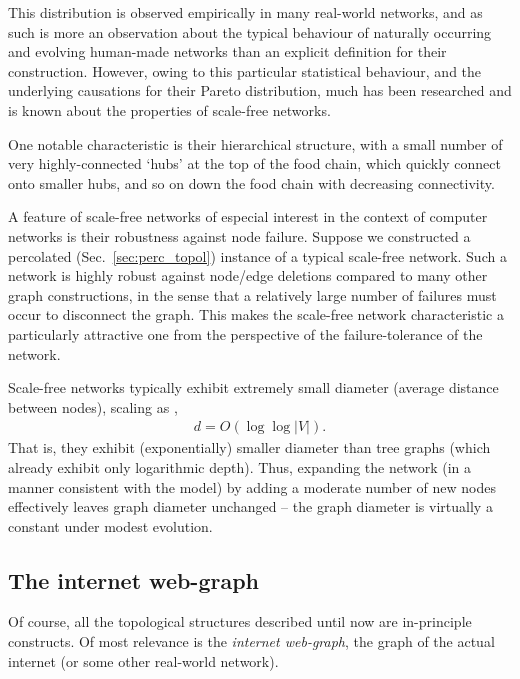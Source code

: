 This distribution is observed empirically in many real-world networks, and as such is more an observation about the typical behaviour of naturally occurring and evolving human-made networks than an explicit definition for their construction. However, owing to this particular statistical behaviour, and the underlying causations for their Pareto distribution, much has been researched and is known about the properties of scale-free networks.

One notable characteristic is their hierarchical structure, with a small number of very highly-connected `hubs' at the top of the food chain, which quickly connect onto smaller hubs, and so on down the food chain with decreasing connectivity.

A feature of scale-free networks of especial interest in the context of computer networks is their robustness against node failure. Suppose we constructed a percolated (Sec.~\ref{sec:perc_topol}) instance of a typical scale-free network. Such a network is highly robust against node/edge deletions compared to many other graph constructions, in the sense that a relatively large number of failures must occur to disconnect the graph. This makes the scale-free network characteristic a particularly attractive one from the perspective of the failure-tolerance of the network.

Scale-free networks typically exhibit extremely small diameter (average distance between nodes), scaling as \cite{bib:PhysRevLett.90.058701},
\begin{align}
	d = O(\log \log |V|).
\end{align}
That is, they exhibit (exponentially) smaller diameter than tree graphs (which already exhibit only logarithmic depth). Thus, expanding the network (in a manner consistent with the model) by adding a moderate number of new nodes effectively leaves graph diameter unchanged -- the graph diameter is virtually a constant under modest evolution.

%
%

\subsection{The internet web-graph} 

Of course, all the topological structures described until now are in-principle constructs. Of most relevance is the \textit{internet web-graph}, the graph of the actual internet (or some other real-world network).


